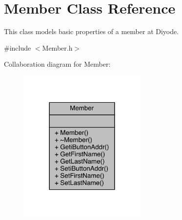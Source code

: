 \hypertarget{class_member}{\section{Member Class Reference}
\label{class_member}
}


This class models basic properties of a member at Diyode.  




{\ttfamily \#include $<$Member.\-h$>$}



Collaboration diagram for Member\-:\nopagebreak
\begin{figure}[H]
\begin{center}
\leavevmode
\includegraphics[width=180pt]{class_member__coll__graph}
\end{center}
\end{figure}
